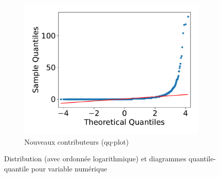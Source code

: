 \documentclass[dvipsnames,runningheads]{llncs}
\begin{document}
\begin{figure}[ht]
\begin{subfigure}[t]{0.333\textwidth}
            \includegraphics[width=\textwidth]{../experiment/data_analysis/newContributorCount_qqplot}
            \caption{Nouveaux contributeurs (qq-plot)}
            \label{sfig:newContributorQQplot}
        \end{subfigure}

        \caption{%
            Distribution (avec ordonnée logarithmique) et diagrammes quantile-quantile pour variable
            numérique%
        }
        \label{fig:distribution}
    \end{figure}
\end{document}
